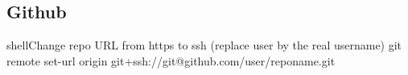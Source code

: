 \documentclass[10pt,a4paper]{article}
\begin{document}
\begin{multicols}{3}
{\centering\section{Github}}

\begin{codebox}{shell}{Change repo URL from https to ssh (replace user by the real username)}
git remote set-url origin git+ssh://git@github.com/user/reponame.git

\end{codebox}


\AtNextBibliography{\footnotesize}
\printbibliography  
\end{multicols}
\end{document}
